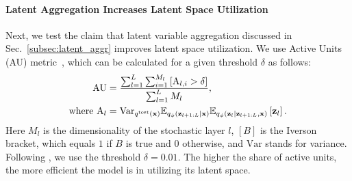 \paragraph{Latent Aggregation Increases Latent Space Utilization}\label{subsec:active_units}

Next, we test the claim that latent variable aggregation discussed in Sec.~\ref{subsec:latent_aggr} improves latent space utilization. We use Active Units (AU) metric~\citep{burda2015importance}, which can be calculated for a given threshold $\delta$ as follows:
\begin{align}\label{eq:active_units}
\text{AU} &= \frac{\sum_{l=1}^L \sum_{i=1}^{M_l}  \left[\text{A}_{l, i} > \delta \right] }{\sum_{l=1}^L M_l }, \\
    \text{where } \text{A}_{l} &= \text{Var}_{q^{\text{test}}(\rvx)} \E_{q_{\phi}(\rvz_{l+1:L}|\rvx)} \E_{q_{\phi}(\rvz_l | \rvz_{l+1:L}, \rvx)}\left[\rvz_l\right].
\end{align}
Here $M_{l}$ is the dimensionality of the stochastic layer $l$, $\left[ B \right]$ is the Iverson bracket, which equals $1$ if $B$ is true and $0$ otherwise, and $\text{Var}$ stands for variance.
Following \citet{burda2015importance}, we use the threshold $\delta = 0.01$. The higher the share of active units, the more efficient the model is in utilizing its latent space. 

